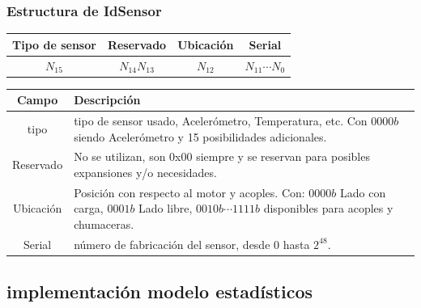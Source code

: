 \documentclass{beamer}
\begin{document}
\begin{frame}
    \frametitle{Estructura de IdSensor}
    \begin{table}[ht]
        \begin{center}
            \begin{tabular}{|c|c|c|c|}
                \hline
                Tipo de sensor & Reservado& Ubicación   & Serial \\\hline\hline
                $ N_{15} $ & $ N_{14}N_{13} $ &$ N_{12} $  &  $ N_{11}\cdots N_{0} $\\
                \hline
            \end{tabular}

            \vspace{0.3cm}
            \begin{tabular}{|c|p{7cm}|}
                \hline
                Campo       & Descripción
                \\\hline\hline
                tipo        & tipo de sensor usado, Acelerómetro, Temperatura, etc.
                Con $0000b$ siendo Acelerómetro y 15 posibilidades adicionales.
                \\\hline
                Reservado   & No se utilizan, son 0x00 siempre y se reservan para
                posibles expansiones y/o necesidades.
                \\\hline
                Ubicación   & Posición con respecto al motor y acoples. Con:
                $0000b$ Lado con carga, $ 0001b$ Lado libre, $ 0010b\cdots1111b $
                disponibles para acoples y chumaceras.
                \\\hline
                Serial      & número de fabricación del sensor, desde 0 hasta $2^{48}$.
                \\\hline
            \end{tabular}
        \end{center}
    \end{table}
\end{frame}

\subsection{implementación modelo estadísticos}
\end{document}
